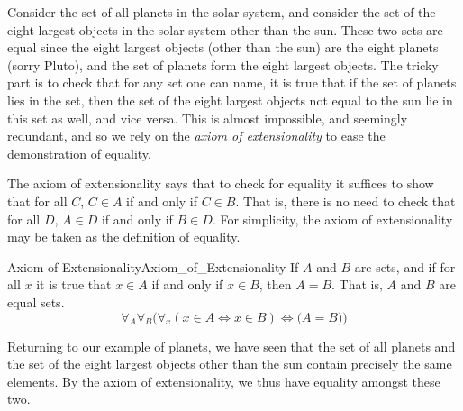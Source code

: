         \begin{example}
            Consider the set of all planets in the solar system, and consider
            the set of the eight largest objects in the solar system other than
            the sun. These two sets are equal since the eight largest objects
            (other than the sun) are the eight planets (sorry Pluto), and the
            set of planets form the eight largest objects. The tricky part is
            to check that for any set one can name, it is true that if the set
            of planets lies in the set, then the set of the eight largest
            objects not equal to the sun lie in this set as well, and vice
            versa. This is almost impossible, and seemingly redundant, and so we
            rely on the \textit{axiom of extensionality} to ease the
            demonstration of equality.
        \end{example}
        The axiom of extensionality says that to check for equality it suffices
        to show that for all $C$, $C\in{A}$ if and only if $C\in{B}$.
        That is, there is no need to check that for all $D$, $A\in{D}$ if and
        only if $B\in{D}$. For simplicity, the axiom of extensionality may be
        taken as the definition of
        equality.
        \begin{faxiom}{Axiom of Extensionality}{Axiom_of_Extensionality}
            If $A$ and $B$ are sets, and if for all $x$ it is true that
            $x\in{A}$ if and only if $x\in{B}$, then $A=B$. That is, $A$ and $B$
            are equal sets.
            \begin{equation*}
                \forall_{A}\forall_{B}\Big(\forall_{x}(x\in{A}\Leftrightarrow
                x\in{B})\Longleftrightarrow\big(A=B\big)\Big)
            \end{equation*}
        \end{faxiom}
        \begin{example}
            Returning to our example of planets, we have seen that the set of
            all planets and the set of the eight largest objects other than the
            sun contain precisely the same elements. By the axiom of
            extensionality, we thus have equality amongst these two.
        \end{example}
